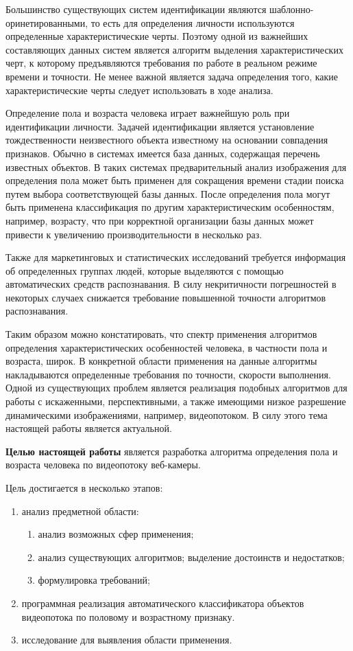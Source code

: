 Большинство существующих систем идентификации являются
шаблонно-оринетированными, то есть для определения личности используются
определенные характеристические черты. Поэтому одной из важнейших составляющих
данных систем является алгоритм выделения характеристических черт, к которому
предъявляются требования по работе в реальном режиме времени и точности. Не
менее важной является задача определения того, какие характеристические черты
следует использовать в ходе анализа.


Определение пола и возраста человека играет важнейшую роль при идентификации
личности. Задачей идентификации является установление тождественности
неизвестного объекта известному на основании совпадения признаков. Обычно в
системах имеется база данных, содержащая перечень известных объектов. В таких
системах предварительный анализ изображения для определения пола может быть
применен для сокращения времени стадии поиска путем выбора соответствующей базы
данных. После определения пола могут быть применена классификация по другим
характеристическим особенностям, например, возрасту, что при корректной
организации базы данных может привести к увеличению производительности в
несколько раз.

Также для маркетинговых и статистических исследований требуется информация об
определенных группах людей, которые выделяются с помощью автоматических средств
распознавания. В силу некритичности погрешностей в некоторых случаех снижается
требование повышенной точности алгоритмов распознавания.

Таким образом можно констатировать, что спектр применения алгоритмов определения
характеристических особенностей человека, в частности пола и возраста, широк. В
конкретной области применения на данные алгоритмы накладываются определенные
требования по точности, скорости выполнения. Одной из существующих проблем
является реализация подобных алгоритмов для работы с искаженными,
перспективными, а также имеющими низкое разрешение динамическими изображениями,
например, видеопотоком. В силу этого тема настоящей работы является актуальной.

{\bf Целью настоящей работы} является разработка алгоритма определения пола и
возраста человека по видеопотоку веб-камеры.

Цель достигается в несколько этапов:
\begin{enumerate}
\item анализ предметной области:
	\begin{enumerate}
		\item анализ возможных сфер применения;
		\item анализ существующих алгоритмов; выделение достоинств и
недостатков;
		\item формулировка требований;
	\end{enumerate}
\item программная реализация автоматического классификатора объектов видеопотока
по половому и возрастному признаку.
\item исследование для выявления области применения.
\end{enumerate}

